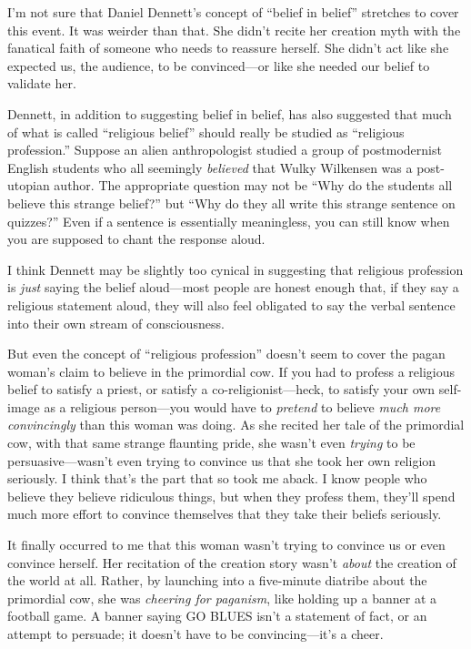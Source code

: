 {
 I'm not sure that Daniel Dennett's
concept of ``belief in belief''
stretches to cover this event. It was weirder than that. She
didn't recite her creation myth with the fanatical
faith of someone who needs to reassure herself. She
didn't act like she expected us, the audience, to be
convinced---or like she needed our belief to validate her.}

{
 Dennett, in addition to suggesting belief in belief, has also
suggested that much of what is called ``religious
belief'' should really be studied as
``religious profession.'' Suppose an
alien anthropologist studied a group of postmodernist English students
who all seemingly \textit{believed} that Wulky Wilkensen was a
post-utopian author. The appropriate question may not be
``Why do the students all believe this strange
belief?'' but ``Why do they all
write this strange sentence on quizzes?'' Even if a
sentence is essentially meaningless, you can still know when you are
supposed to chant the response aloud.}

{
 I think Dennett may be slightly too cynical in suggesting that
religious profession is \textit{just} saying the belief aloud---most
people are honest enough that, if they say a religious statement aloud,
they will also feel obligated to say the verbal sentence into their own
stream of consciousness.}

{
 But even the concept of ``religious
profession'' doesn't seem to cover
the pagan woman's claim to believe in the primordial
cow. If you had to profess a religious belief to satisfy a priest, or
satisfy a co-religionist---heck, to satisfy your own self-image as a
religious person---you would have to \textit{pretend} to believe
\textit{much more convincingly} than this woman was doing. As she
recited her tale of the primordial cow, with that same strange
flaunting pride, she wasn't even \textit{trying} to be
persuasive---wasn't even trying to convince us that she
took her own religion seriously. I think that's the
part that so took me aback. I know people who believe they believe
ridiculous things, but when they profess them, they'll
spend much more effort to convince themselves that they take their
beliefs seriously.}

{
 It finally occurred to me that this woman wasn't
trying to convince us or even convince herself. Her recitation of the
creation story wasn't \textit{about} the creation of
the world at all. Rather, by launching into a five-minute diatribe
about the primordial cow, she was \textit{cheering for paganism}, like
holding up a banner at a football game. A banner saying GO BLUES
isn't a statement of fact, or an attempt to persuade;
it doesn't have to be convincing---it's
a cheer.}

